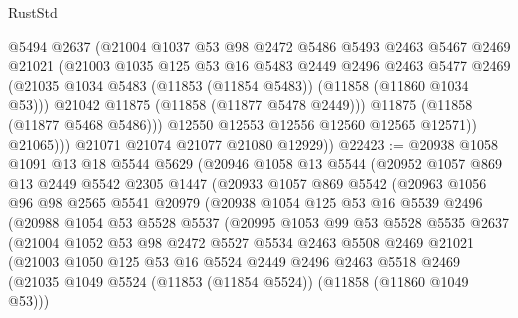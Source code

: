 \begin{lexlean}{RustStd}
\begin{coremodule}
                  @5494
                  @2637
                  (@21004
                    @1037
                    @53
                    @98
                    @2472
                    @5486
                    @5493
                    @2463
                    @5467
                    @2469
                    @21021
                    (@21003
                      @1035
                      @125
                      @53
                      @16
                      @5483
                      @2449
                      @2496
                      @2463
                      @5477
                      @2469
                      (@21035 @1034 @5483 (@11853 (@11854 @5483)) (@11858 (@11860 @1034 @53)))
                      @21042
                      @11875
                      (@11858 (@11877 @5478 @2449)))
                    @11875
                    (@11858 (@11877 @5468 @5486)))
                  @12550
                  @12553
                  @12556
                  @12560
                  @12565
                  @12571))
              @21065)))
        @21071
        @21074
        @21077
        @21080
        @12929))
@22423 := @20938
    @1058
    @1091
    @13
    @18
    @5544
    @5629
    (@20946
      @1058
      @13
      @5544
      (@20952
        @1057
        @869
        @13
        @2449
        @5542
        @2305
        @1447
        (@20933
          @1057
          @869
          @5542
          (@20963
            @1056
            @96
            @98
            @2565
            @5541
            @20979
            (@20938
              @1054
              @125
              @53
              @16
              @5539
              @2496
              (@20988
                @1054
                @53
                @5528
                @5537
                (@20995
                  @1053
                  @99
                  @53
                  @5528
                  @5535
                  @2637
                  (@21004
                    @1052
                    @53
                    @98
                    @2472
                    @5527
                    @5534
                    @2463
                    @5508
                    @2469
                    @21021
                    (@21003
                      @1050
                      @125
                      @53
                      @16
                      @5524
                      @2449
                      @2496
                      @2463
                      @5518
                      @2469
                      (@21035 @1049 @5524 (@11853 (@11854 @5524)) (@11858 (@11860 @1049 @53)))

\end{coremodule}
\end{lexlean}
